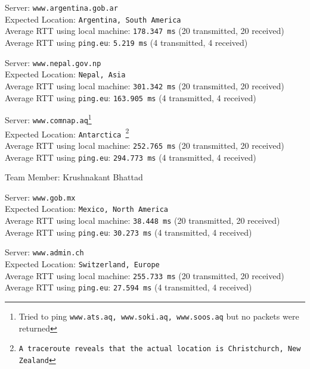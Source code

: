 \documentclass[11pt, fleqn]{article}
\begin{document}
\hrulefill
\smallskip

Server: \texttt{www.argentina.gob.ar}\\
Expected Location: \texttt{Argentina, South America}\\
Average RTT using local machine: \texttt{178.347 ms} (20 transmitted, 20 received)\\
Average RTT using \texttt{ping.eu}: \texttt{5.219 ms} (4 transmitted, 4 received)

\hrulefill
\smallskip

Server: \texttt{www.nepal.gov.np}\\
Expected Location: \texttt{Nepal, Asia}\\
Average RTT using local machine: \texttt{301.342 ms} (20 transmitted, 20 received)\\
Average RTT using \texttt{ping.eu}: \texttt{163.905 ms} (4 transmitted, 4 received)

\hrulefill
\smallskip

Server: \texttt{www.comnap.aq}\footnote{Tried to ping \texttt{www.ats.aq, www.soki.aq, www.soos.aq} but no packets were returned}\\
Expected Location: \texttt{Antarctica \footnote{A \texttt{traceroute} reveals that the actual location is Christchurch, New Zealand}}\\
Average RTT using local machine: \texttt{252.765 ms} (20 transmitted, 20 received)\\
Average RTT using \texttt{ping.eu}: \texttt{294.773 ms} (4 transmitted, 4 received)

\newpage

Team Member: Krushnakant Bhattad

\hrulefill
\smallskip

Server: \texttt{www.gob.mx} \\
Expected Location: \texttt{Mexico, North America}\\
Average RTT using local machine: \texttt{38.448 ms} (20 transmitted, 20 received)\\
Average RTT using \texttt{ping.eu}: \texttt{30.273 ms} (4 transmitted, 4 received)


\hrulefill
\smallskip

Server: \texttt{www.admin.ch} \\
Expected Location: \texttt{Switzerland, Europe}\\
Average RTT using local machine: \texttt{255.733 ms} (20 transmitted, 20 received)\\
Average RTT using \texttt{ping.eu}: \texttt{27.594 ms} (4 transmitted, 4 received)
\end{document}
